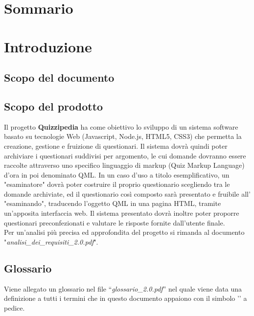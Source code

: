 \documentclass[a4paper,11pt]{article}
\begin{document}
	\newpage
	\fancyhead[R]{\leftmark} %
	\tableofcontents
	\newpage
	\listoffigures
	\listoftables
	
	\newpage
	
	\section*{Sommario}
	
	
	\newpage
	\section{Introduzione}
	\subsection{Scopo del documento}
	
	
	\subsection{Scopo del prodotto}
	Il progetto \textbf{Quizzipedia} ha come obiettivo lo sviluppo di un sistema software basato su tecnologie Web (Javascript\addglos, Node.js\addglos, HTML5\addglos, CSS3\addglos) che permetta la creazione, gestione e fruizione di questionari. Il sistema dovrà quindi poter archiviare i questionari suddivisi per argomento, le cui domande dovranno essere raccolte attraverso uno specifico linguaggio di markup (Quiz Markup Language) d'ora in poi denominato QML\addglos. In un caso d'uso a titolo esemplificativo, un "esaminatore" dovrà poter costruire il proprio questionario scegliendo tra le domande archiviate, ed il questionario così composto sarà presentato e fruibile all' "esaminando", traducendo l'oggetto QML in una pagina HTML\addglos, tramite un'apposita interfaccia web. Il sistema presentato dovrà inoltre poter proporre questionari preconfezionati e valutare le risposte fornite dall'utente finale.
	\\
	Per un'analisi più precisa ed approfondita del progetto si rimanda al documento\\ "\textit{analisi\_dei\_requisiti\_2.0.pdf}".
	\subsection{Glossario}
	Viene allegato un glossario nel file ``\textit{glossario\_2.0.pdf}'' nel quale viene data una definizione a tutti i termini che in questo documento appaiono con il simbolo '\addglos' a pedice.
\end{document}
